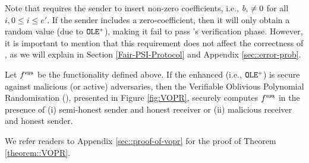 \vspace{-6.3mm}


Note that \vopr requires the sender to insert non-zero coefficients, i.e., $b_{\scriptscriptstyle i}\neq 0$ for all $i,0 \leq i \leq e'$. If the sender includes a zero-coefficient, then it will only obtain a random value (due to  $\mathtt{OLE}^{\scriptscriptstyle +}$), making it fail to pass \vopr's verification phase. However, it is important to mention that this requirement does not affect the correctness of \withFai, as we will explain in Section \ref{Fair-PSI-Protocol} and Appendix \ref{sec::error-prob}.  

\vspace{-2mm}



\begin{theorem}\label{theorem::VOPR}
%
Let $f^{\scriptscriptstyle \mathtt{VOPR}}$ be the functionality defined above. If the enhanced \ole (i.e., $\mathtt{OLE}^{\scriptscriptstyle +}$) is secure against malicious (or active) adversaries, then the  Verifiable Oblivious Polynomial Randomisation (\vopr), presented in Figure \ref{fig:VOPR}, securely computes $f^{\scriptscriptstyle \mathtt{VOPR}}$ in the presence of (i) semi-honest sender and honest receiver or (ii) malicious receiver and honest sender. 
%
\end{theorem}

\vspace{-1mm}
We refer readers to Appendix \ref{sec::proof-of-vopr} for the proof of Theorem \ref{theorem::VOPR}. 
\vspace{-1mm}



%

